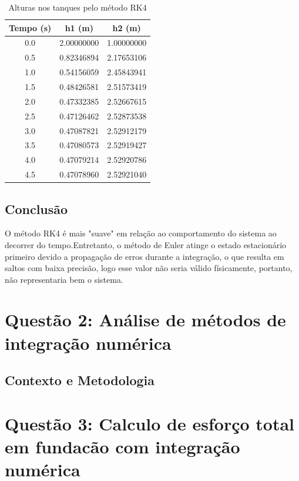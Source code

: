 \documentclass{article}
\begin{document}
\begin{table}[htbp]
    \centering
    \caption{Alturas nos tanques pelo método RK4}\label{tab:resultados_rk4}
    \begin{tabular}{c c c}
        \toprule
        \textbf{Tempo (s)} & \textbf{h1 (m)} & \textbf{h2 (m)} \\
        \midrule
        0.0 & 2.00000000 & 1.00000000 \\
        0.5 & 0.82346894 & 2.17653106 \\
        1.0 & 0.54156059 & 2.45843941 \\
        1.5 & 0.48426581 & 2.51573419 \\
        2.0 & 0.47332385 & 2.52667615 \\
        2.5 & 0.47126462 & 2.52873538 \\
        3.0 & 0.47087821 & 2.52912179 \\
        3.5 & 0.47080573 & 2.52919427 \\
        4.0 & 0.47079214 & 2.52920786 \\
        4.5 & 0.47078960 & 2.52921040 \\
        \bottomrule
    \end{tabular}
\end{table}
\subsection*{Conclusão}
O método RK4 é mais "suave" em relação ao comportamento do sistema ao decorrer do tempo.Entretanto, o método de Euler atinge o estado estacionário primeiro devido a propagação de erros durante a integração, o que resulta em saltos com baixa precisão, logo esse valor não seria válido físicamente, portanto, não representaria bem o sistema.



\section*{Questão 2: Análise de métodos de integração numérica}
\justifying
\subsection*{Contexto e Metodologia}



\section*{Questão 3:  Calculo de esforço total em fundacão com integração numérica}
\justifying
\end{document}
